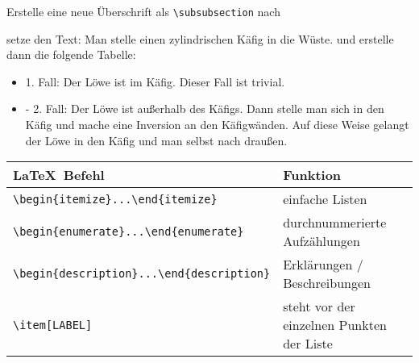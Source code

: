 \begin{frame}[fragile]
	\vspace{-0.3cm}
	\begin{Aufgabe}
		Erstelle eine neue Überschrift als \lstinline[basicstyle=\normalfont\normalsize]|\subsubsection| nach 
		
		\textrm{}
		
		setze den Text:	\textrm{Man stelle einen zylindrischen Käfig in die Wüste.}	und erstelle dann die folgende Tabelle:
	\end{Aufgabe}
	\begin{outputbox}
		\vspace{-0.2cm}
		\begin{itemize}
			\item[-]
				1. Fall: Der Löwe ist im Käfig. Dieser Fall ist trivial.
			\item[-]
				2. Fall: Der Löwe ist außerhalb des Käfigs. Dann stelle man sich in den Käfig und mache eine Inversion an den Käfigwänden. Auf diese Weise gelangt der Löwe in den Käfig und man selbst nach draußen.
		\end{itemize}
		\vspace{-0.2cm}
	\end{outputbox}
	\btVFill\Befehle
	\begin{center}
		\begin{tabular}{ll}
			\toprule
			\LaTeX\ Befehl										&	Funktion									\\ \midrule
			\lstinline|\begin{itemize}...\end{itemize}|			&	einfache Listen								\\
			\lstinline|\begin{enumerate}...\end{enumerate}|		&	durchnummerierte Aufzählungen				\\
			\lstinline|\begin{description}...\end{description}|	&	Erklärungen / Beschreibungen				\\
			\lstinline|\item[LABEL]|							&	steht vor der einzelnen Punkten der Liste	\\
			\bottomrule
		\end{tabular}
	\end{center}
	\vspace{0.1cm}
\end{frame}
